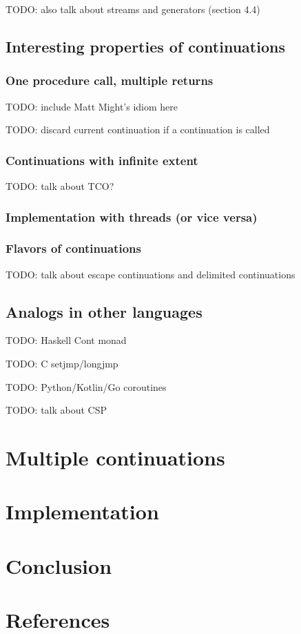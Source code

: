 \documentclass[]{article}
\begin{document}
TODO: also talk about streams and generators (section 4.4)

\subsection{Interesting properties of continuations}
\label{sec:inte}

\subsubsection{One procedure call, multiple returns}
\label{sec:mult}

TODO: include Matt Might's idiom here

TODO: discard current continuation if a continuation is called

\subsubsection{Continuations with infinite extent}
\label{sec:infi}

TODO: talk about TCO?

\subsubsection{Implementation with threads (or vice versa)}
\label{sec:thre}

\subsubsection{Flavors of continuations}
\label{sec:flav}

TODO: talk about escape continuations and delimited continuations

\subsection{Analogs in other languages}
\label{sec:anal}

TODO: Haskell Cont monad

TODO: C setjmp/longjmp

TODO: Python/Kotlin/Go coroutines

TODO: talk about CSP %

\section{Multiple continuations}
\label{sec:mulc}



\section{Implementation}
\label{sec:impl}

\section{Conclusion}
\label{sec:conc}

\section{References}
\label{sec:refe}
\end{document}
